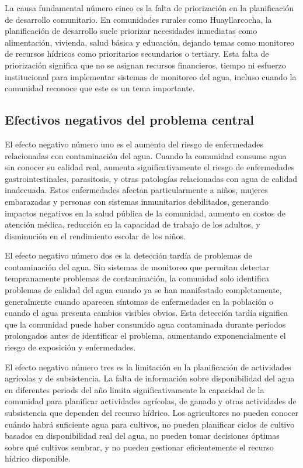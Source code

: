 La causa fundamental número cinco es la falta de priorización en la planificación de desarrollo comunitario. En comunidades rurales como Huayllarcocha, la planificación de desarrollo suele priorizar necesidades inmediatas como alimentación, vivienda, salud básica y educación, dejando temas como monitoreo de recursos hídricos como prioritarios secundarios o tertiary. Esta falta de priorización significa que no se asignan recursos financieros, tiempo ni esfuerzo institucional para implementar sistemas de monitoreo del agua, incluso cuando la comunidad reconoce que este es un tema importante.

\subsection{Efectivos negativos del problema central}

El efecto negativo número uno es el aumento del riesgo de enfermedades relacionadas con contaminación del agua. Cuando la comunidad consume agua sin conocer su calidad real, aumenta significativamente el riesgo de enfermedades gastrointestinales, parasitosis, y otras patologías relacionadas con agua de calidad inadecuada. Estos enfermedades afectan particularmente a niños, mujeres embarazadas y personas con sistemas inmunitarios debilitados, generando impactos negativos en la salud pública de la comunidad, aumento en costos de atención médica, reducción en la capacidad de trabajo de los adultos, y disminución en el rendimiento escolar de los niños.

El efecto negativo número dos es la detección tardía de problemas de contaminación del agua. Sin sistemas de monitoreo que permitan detectar tempranamente problemas de contaminación, la comunidad solo identifica problemas de calidad del agua cuando ya se han manifestado completamente, generalmente cuando aparecen síntomas de enfermedades en la población o cuando el agua presenta cambios visibles obvios. Esta detección tardía significa que la comunidad puede haber consumido agua contaminada durante periodos prolongados antes de identificar el problema, aumentando exponencialmente el riesgo de exposición y enfermedades.

El efecto negativo número tres es la limitación en la planificación de actividades agrícolas y de subsistencia. La falta de información sobre disponibilidad del agua en diferentes periods del año limita significativamente la capacidad de la comunidad para planificar actividades agrícolas, de ganado y otras actividades de subsistencia que dependen del recurso hídrico. Los agricultores no pueden conocer cuándo habrá suficiente agua para cultivos, no pueden planificar ciclos de cultivo basados en disponibilidad real del agua, no pueden tomar decisiones óptimas sobre qué cultivos sembrar, y no pueden gestionar eficientemente el recurso hídrico disponible.

